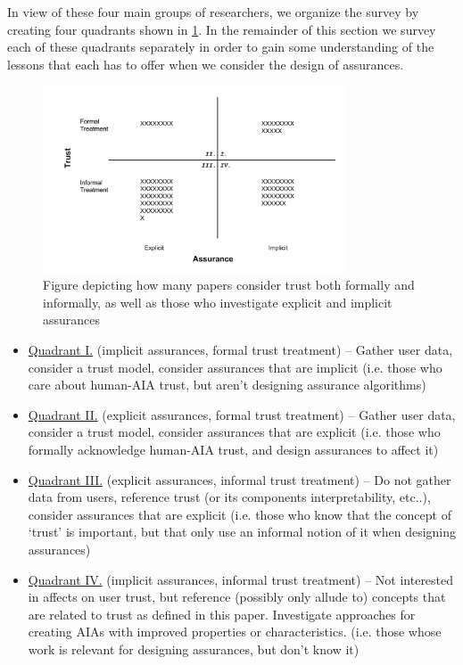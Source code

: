 In view of these four main groups of researchers, we organize the survey by creating four quadrants shown in \ref{fig:trust_assurance_intention}. In the remainder of this section we survey each of these quadrants separately in order to gain some understanding of the lessons that each has to offer when we consider the design of assurances.

\begin{figure}[htbp]
    \centering
    \includegraphics[width=0.8\textwidth]{Figures/Trust_vs_Assurance_Intention.pdf}
    \caption{Figure depicting how many papers consider trust both formally and informally, as well as those who investigate explicit and implicit assurances}
    \label{fig:trust_assurance_intention}
\end{figure}

\begin{itemize}
    \item \hyperref[sec:q1]{Quadrant I.} (implicit assurances, formal trust treatment) -- Gather user data, consider a trust model, consider assurances that are implicit (i.e. those who care about human-AIA trust, but aren't designing assurance algorithms)
    \item \hyperref[sec:q2]{Quadrant II.} (explicit assurances, formal trust treatment) -- Gather user data, consider a trust model, consider assurances that are explicit (i.e. those who formally acknowledge human-AIA trust, and design assurances to affect it)
    \item \hyperref[sec:q3]{Quadrant III.} (explicit assurances, informal trust treatment) -- Do not gather data from users, reference trust (or its components interpretability, etc..), consider assurances that are explicit (i.e. those who know that the concept of `trust' is important, but that only use an informal notion of it when designing assurances)
    \item \hyperref[sec:q4]{Quadrant IV.} (implicit assurances, informal trust treatment) -- Not interested in affects on user trust, but reference (possibly only allude to) concepts that are related to trust as defined in this paper. Investigate approaches for creating AIAs with improved properties or characteristics. (i.e. those whose work is relevant for designing assurances, but don't know it)
\end{itemize}





